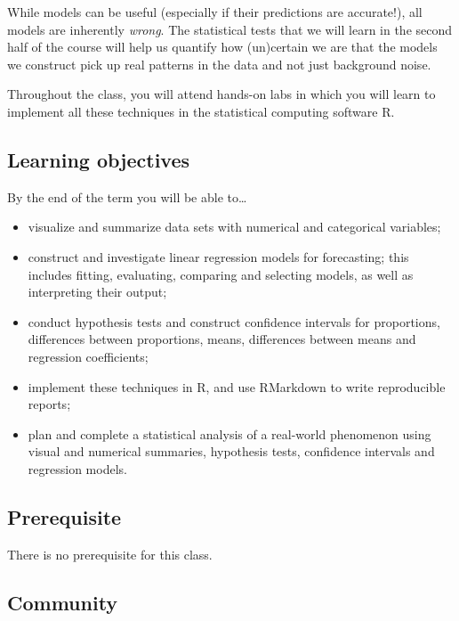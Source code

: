 \documentclass[
  letterpaper,
  DIV=11,
  numbers=noendperiod]{scrartcl}
\providecommand{\tightlist}{%
  \setlength{\itemsep}{0pt}\setlength{\parskip}{0pt}}
\begin{document}
While models can be useful (especially if their predictions are
accurate!), all models are inherently \emph{wrong}. The statistical
tests that we will learn in the second half of the course will help us
quantify how (un)certain we are that the models we construct pick up
real patterns in the data and not just background noise.

Throughout the class, you will attend hands-on labs in which you will
learn to implement all these techniques in the statistical computing
software R.

\hypertarget{learning-objectives}{%
\subsection{Learning objectives}\label{learning-objectives}}

By the end of the term you will be able to\ldots{}

\begin{itemize}
\tightlist
\item
  visualize and summarize data sets with numerical and categorical
  variables;
\item
  construct and investigate linear regression models for forecasting;
  this includes fitting, evaluating, comparing and selecting models, as
  well as interpreting their output;
\item
  conduct hypothesis tests and construct confidence intervals for
  proportions, differences between proportions, means, differences
  between means and regression coefficients;
\item
  implement these techniques in R, and use RMarkdown to write
  reproducible reports;
\item
  plan and complete a statistical analysis of a real-world phenomenon
  using visual and numerical summaries, hypothesis tests, confidence
  intervals and regression models.
\end{itemize}

\hypertarget{prerequisite}{%
\subsection{Prerequisite}\label{prerequisite}}

There is no prerequisite for this class.

\hypertarget{community}{%
\subsection{Community}\label{community}}
\end{document}
